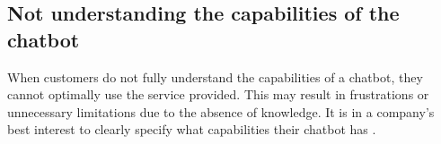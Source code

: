 \subsection{Not understanding the capabilities of the chatbot}
When customers do not fully understand the capabilities of a chatbot, they cannot optimally use the service provided. This may result in frustrations or unnecessary limitations due to the absence of knowledge. It is in a company's best interest to clearly specify what capabilities their chatbot has \citep{brandtzaeg2020}.
